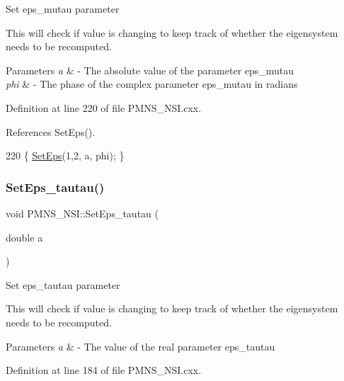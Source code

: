 Set eps\+\_\+mutau parameter

This will check if value is changing to keep track of whether the eigensystem needs to be recomputed.


\begin{DoxyParams}{Parameters}
{\em a} & -\/ The absolute value of the parameter eps\+\_\+mutau \\
\hline
{\em phi} & -\/ The phase of the complex parameter eps\+\_\+mutau in radians \\
\hline
\end{DoxyParams}


Definition at line 220 of file P\+M\+N\+S\+\_\+\+N\+S\+I.\+cxx.



References Set\+Eps().


\begin{DoxyCode}
220 \{ \hyperlink{classOscProb_1_1PMNS__NSI_a87c508149ea36b6de493a6817247a0ea}{SetEps}(1,2, a, phi); \}
\end{DoxyCode}
\mbox{\label{classOscProb_1_1PMNS__NSI_a5736f3cd792a621dfa844c3fa314cd17}} 
\subsubsection{\texorpdfstring{Set\+Eps\+\_\+tautau()}{SetEps\_tautau()}}
{\footnotesize\ttfamily void P\+M\+N\+S\+\_\+\+N\+S\+I\+::\+Set\+Eps\+\_\+tautau (\begin{DoxyParamCaption}\item[{double}]{a }\end{DoxyParamCaption})\hspace{0.3cm}{\ttfamily [virtual]}}

Set eps\+\_\+tautau parameter

This will check if value is changing to keep track of whether the eigensystem needs to be recomputed.


\begin{DoxyParams}{Parameters}
{\em a} & -\/ The value of the real parameter eps\+\_\+tautau \\
\hline
\end{DoxyParams}


Definition at line 184 of file P\+M\+N\+S\+\_\+\+N\+S\+I.\+cxx.



